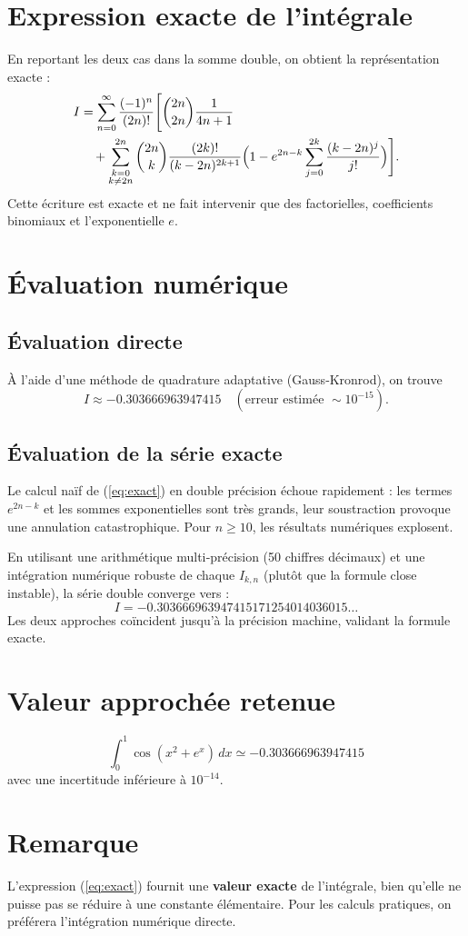 \documentclass[a4paper,12pt]{article}
\begin{document}
\section{Expression exacte de l’intégrale}
En reportant les deux cas dans la somme double, on obtient la représentation exacte :
\begin{align}
I &= \sum_{n=0}^{\infty} \frac{(-1)^n}{(2n)!}
\Bigg[ \binom{2n}{2n}\frac{1}{4n+1} \nonumber \\
&\quad + \sum_{\substack{k=0\\k\neq 2n}}^{2n} \binom{2n}{k}
\frac{(2k)!}{(k-2n)^{2k+1}}
\Bigl(1 - e^{2n-k}\sum_{j=0}^{2k}\frac{(k-2n)^j}{j!}\Bigr) \Bigg]. \label{eq:exact}
\end{align}
Cette écriture est exacte et ne fait intervenir que des factorielles, coefficients binomiaux et l’exponentielle $e$.

\section{Évaluation numérique}
\subsection{Évaluation directe}
À l’aide d’une méthode de quadrature adaptative (Gauss‑Kronrod), on trouve
\[
I \approx -0.303666963947415 \quad (\text{erreur estimée } \sim 10^{-15}).
\]

\subsection{Évaluation de la série exacte}
Le calcul naïf de (\ref{eq:exact}) en double précision échoue rapidement : les termes $e^{2n-k}$ et les sommes exponentielles sont très grands, leur soustraction provoque une annulation catastrophique. Pour $n\ge 10$, les résultats numériques explosent.

En utilisant une arithmétique multi‑précision (50 chiffres décimaux) et une intégration numérique robuste de chaque $I_{k,n}$ (plutôt que la formule close instable), la série double converge vers :
\[
I = -0.303666963947415171254014036015\ldots
\]
Les deux approches coïncident jusqu’à la précision machine, validant la formule exacte.

\section{Valeur approchée retenue}
\[
\boxed{\int_0^1 \cos(x^2+e^x)\,dx \simeq -0.303666963947415}
\]
avec une incertitude inférieure à $10^{-14}$.

\section*{Remarque}
L’expression (\ref{eq:exact}) fournit une \textbf{valeur exacte} de l’intégrale, bien qu’elle ne puisse pas se réduire à une constante élémentaire. Pour les calculs pratiques, on préférera l’intégration numérique directe.
\end{document}

